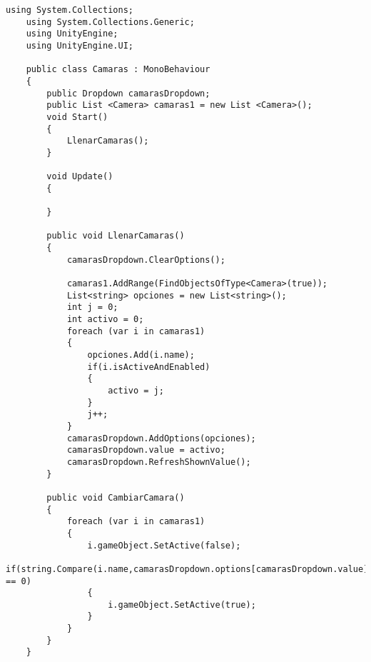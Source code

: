 \begin{lstlisting}[frame=single]
    using System.Collections;
    using System.Collections.Generic;
    using UnityEngine;
    using UnityEngine.UI;

    public class Camaras : MonoBehaviour
    {
        public Dropdown camarasDropdown;
        public List <Camera> camaras1 = new List <Camera>();
        void Start()
        {
            LlenarCamaras();
        }

        void Update()
        {
            
        }

        public void LlenarCamaras()
        {
            camarasDropdown.ClearOptions();
            
            camaras1.AddRange(FindObjectsOfType<Camera>(true));
            List<string> opciones = new List<string>();
            int j = 0;
            int activo = 0;
            foreach (var i in camaras1)
            {
                opciones.Add(i.name);
                if(i.isActiveAndEnabled)
                {
                    activo = j;
                }
                j++;
            }
            camarasDropdown.AddOptions(opciones);
            camarasDropdown.value = activo;
            camarasDropdown.RefreshShownValue();
        }

        public void CambiarCamara()
        {
            foreach (var i in camaras1)
            {
                i.gameObject.SetActive(false);
                if(string.Compare(i.name,camarasDropdown.options[camarasDropdown.value].text) == 0)
                {
                    i.gameObject.SetActive(true);
                }
            }
        }
    }
\end{lstlisting}